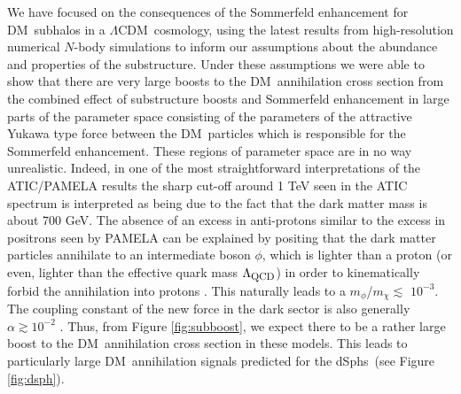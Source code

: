 \documentclass[aps,prd,twocolumn,amsmath,amssymb,floatfix,nofootinbib,10pt]{revtex4}
\newcommand{\CDM}{CDM}
\newcommand{\LCDM}{\ensuremath{\Lambda}\CDM}
\newcommand{\DM}{DM}
\newcommand{\mdm}{\ensuremath{m_{\chi}}}
\newcommand{\mv}{\ensuremath{m_{\phi}}}
\newcommand{\dSphs}{dSphs}
\begin{document}
We have focused on the consequences of the Sommerfeld enhancement for
\DM\ subhalos in a \LCDM\ cosmology, using the latest results from
high-resolution numerical $N$-body simulations to inform our
assumptions about the abundance and properties of the
substructure. Under these assumptions we were able to show that there
are very large boosts to the \DM\ annihilation cross section from the
combined effect of substructure boosts and Sommerfeld enhancement in
large parts of the parameter space consisting of the parameters of the
attractive Yukawa type force between the \DM\ particles which is
responsible for the Sommerfeld enhancement. These regions of parameter
space are in no way unrealistic. Indeed, in one of the most
straightforward interpretations of the ATIC/PAMELA results the sharp
cut-off around 1 TeV seen in the ATIC spectrum is interpreted as being
due to the fact that the dark matter mass is about 700 GeV. The
absence of an excess in anti-protons similar to the excess in
positrons seen by PAMELA can be explained by positing that the dark
matter particles annihilate to an intermediate boson $\phi$, which is
lighter than a proton (or even, lighter than the effective quark mass
$\Lambda_{\mbox{\footnotesize QCD}}$) in order to kinematically forbid
the annihilation into protons \cite{2008arXiv0811.3641C}. This
naturally leads to a \mv/\mdm $\lesssim$ $10^{-3}$. The coupling
constant of the new force in the dark sector is also generally $\alpha
\gtrsim 10^{-2}$ \cite{ArkaniHamed:2008qn,2008arXiv0812.0360L}. Thus,
from Figure \ref{fig:subboost}, we expect there to be a rather large
boost to the \DM\ annihilation cross section in these models. This
leads to particularly large \DM\ annihilation signals predicted for
the \dSphs\ (see Figure \ref{fig:dsph}).
\end{document}
